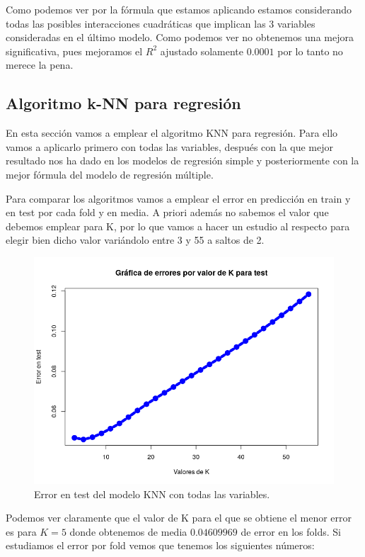 \documentclass[12pt,a4paper]{article}
\begin{document}
Como podemos ver por la fórmula que estamos aplicando estamos considerando todas las posibles interacciones cuadráticas que implican las 3 variables consideradas en el último modelo. Como podemos ver no obtenemos una mejora significativa, pues mejoramos el $R^2$ ajustado solamente $0.0001$ por lo tanto no merece la pena.

\subsection{Algoritmo k-NN para regresión}

En esta sección vamos a emplear el algoritmo KNN para regresión. Para ello vamos a aplicarlo primero con todas las variables, después con la que mejor resultado nos ha dado en los modelos de regresión simple y posteriormente con la mejor fórmula del modelo de regresión múltiple.

Para comparar los algoritmos vamos a emplear el error en predicción en train y en test por cada fold y en media. A priori además no sabemos el valor que debemos emplear para K, por lo que vamos a hacer un estudio al respecto para elegir bien dicho valor variándolo entre 3 y 55 a saltos de 2.

\begin{figure}[H]
	\centering 
	\includegraphics[scale=0.6]{./Imagenes/Regresion/knn1.png}
	\caption{Error en test del modelo KNN con todas las variables.}
\end{figure}

Podemos ver claramente que el valor de K para el que se obtiene el menor error es para $K=5$ donde obtenemos de media $0.04609969$ de error en los folds. Si estudiamos el error por fold vemos que tenemos los siguientes números:
\end{document}
